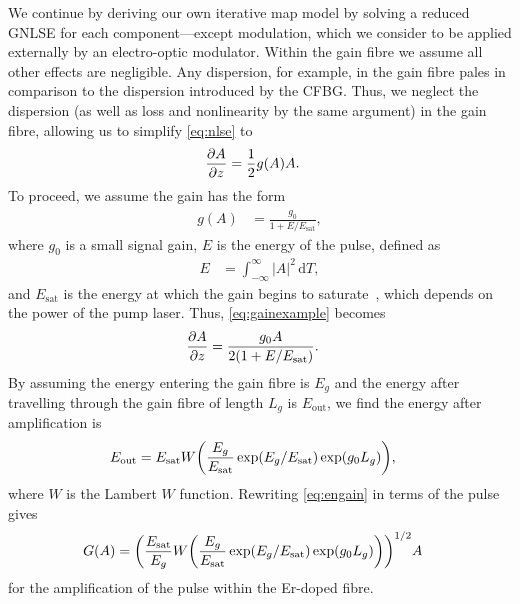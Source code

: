 \documentclass[9pt,twocolumn,twoside]{osajnl}
\let\originalleft\left
\let\originalright\right
\renewcommand{\left}{\mathopen{}\mathclose\bgroup\originalleft}
\renewcommand{\right}{\aftergroup\egroup\originalright}
\providecommand{\df}{\textrm{d}} %
\newcommand{\pdiff}[3][\hspace{-0.5pt}]{\frac{\partial^{#1}#2}{\partial{#3}^{#1}}} %
\newcommand{\Es}{E_{\textrm{sat}}} %
\begin{document}
We continue by deriving our own iterative map model by solving a reduced GNLSE for each component---except modulation, which we consider to be applied externally by an electro-optic modulator. Within the gain fibre we assume all other effects are negligible. Any dispersion, for example, in the gain fibre pales in comparison to the dispersion introduced by the CFBG. Thus, we neglect the dispersion (as well as loss and nonlinearity by the same argument) in the gain fibre, allowing us to simplify \eqref{eq:nlse} to
\begin{align}
	\pdiff{A}{z} &= \frac{1}{2}g(A)A.
	\label{eq:gainexample}
\end{align}
To proceed, we assume the gain has the form
\begin{align}
	g(A) &= \frac{g_0}{1 + E / \Es},
\end{align}
where $g_0$ is a small signal gain, $E$ is the energy of the pulse, defined as
\begin{align}
	E &= \int_{-\infty}^\infty |A|^2 \, \df T,
	\label{eq:energy}
\end{align}
and $\Es$ is the energy at which the gain begins to saturate~\cite{haus1984, shtyrina2017, silfvast2004}, which depends on the power of the pump laser. Thus, \eqref{eq:gainexample} becomes
\begin{align}
	\pdiff{A}{z} &= \frac{g_0 A}{2 \left( 1 + E / \Es \right)}.
\end{align}
By assuming the energy entering the gain fibre is $E_g$ and the energy after travelling through the gain fibre of length $L_g$ is $E_{\text{out}}$, we find the energy after amplification is
\begin{align}
	\label{eq:engain}
	E_{\text{out}} &= \Es W \left( \frac{E_g}{\Es} \exp( E_g / \Es ) \exp( g_0 L_g ) \right),
\end{align}
where $W$ is the Lambert $W$ function. Rewriting \eqref{eq:engain} in terms of the pulse gives
\begin{align}
	G(A) &= \left( \frac{\Es}{E_g} W \left( \frac{E_g}{\Es} \exp( E_g / \Es ) \exp( g_0 L_g ) \right) \right)^{1/2} A
	\label{eq:gainform}
\end{align}
for the amplification of the pulse within the Er-doped fibre.
\end{document}
